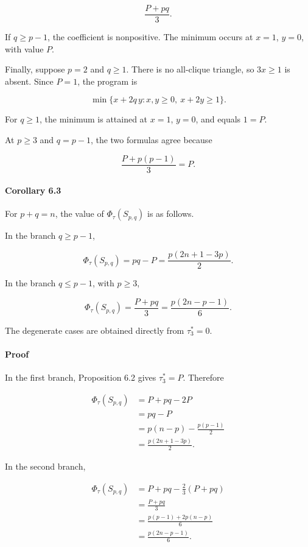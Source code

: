 \documentclass[
  american,
  11pt,
  a4paper,
]{article}
\begin{document}
\[
\frac{P+pq}{3}.
\]

If \(q\ge p-1\), the coefficient is nonpositive. The minimum occurs at \(x=1\), \(y=0\), with value \(P\).

Finally, suppose \(p=2\) and \(q\ge1\). There is no all-clique triangle, so \(3x\ge1\) is absent. Since \(P=1\), the program is

\[
\min\{x+2q\,y:x,y\ge0,\ x+2y\ge1\}.
\]

For \(q\ge1\), the minimum is attained at \(x=1\), \(y=0\), and equals \(1=P\).

At \(p\ge3\) and \(q=p-1\), the two formulas agree because

\[
\frac{P+p(p-1)}{3}=P.
\]

\paragraph{Corollary 6.3}\label{corollary-6.3}

For \(p+q=n\), the value of \(\Phi_\tau(S_{p,q})\) is as follows.

In the branch \(q\ge p-1\),

\[
\Phi_\tau(S_{p,q})
=
pq-P
=
\frac{p(2n+1-3p)}2.
\tag{6.1}
\]

In the branch \(q\le p-1\), with \(p\ge3\),

\[
\Phi_\tau(S_{p,q})
=
\frac{P+pq}{3}
=
\frac{p(2n-p-1)}6.
\tag{6.2}
\]

The degenerate cases are obtained directly from \(\tau_3^*=0\).

\paragraph{Proof}\label{proof-10}

In the first branch, Proposition 6.2 gives \(\tau_3^*=P\). Therefore

\[
\begin{aligned}
\Phi_\tau(S_{p,q})
&=
P+pq-2P\\
&=
pq-P\\
&=
p(n-p)-\frac{p(p-1)}2\\
&=
\frac{p(2n+1-3p)}2.
\end{aligned}
\]

In the second branch,

\[
\begin{aligned}
\Phi_\tau(S_{p,q})
&=
P+pq-\frac23(P+pq)\\
&=
\frac{P+pq}{3}\\
&=
\frac{p(p-1)+2p(n-p)}6\\
&=
\frac{p(2n-p-1)}6.
\end{aligned}
\]
\end{document}
